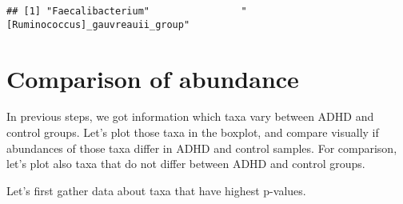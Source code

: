 \documentclass[
  oneside]{book}
\begin{document}
\begin{verbatim}
## [1] "Faecalibacterium"                "[Ruminococcus]_gauvreauii_group"
\end{verbatim}

\hypertarget{comparison-of-abundance}{%
\section{Comparison of abundance}\label{comparison-of-abundance}}

In previous steps, we got information which taxa vary between ADHD and control groups.
Let's plot those taxa in the boxplot, and compare visually if abundances of those taxa
differ in ADHD and control samples. For comparison, let's plot also taxa that do not
differ between ADHD and control groups.

Let's first gather data about taxa that have highest p-values.
\end{document}
